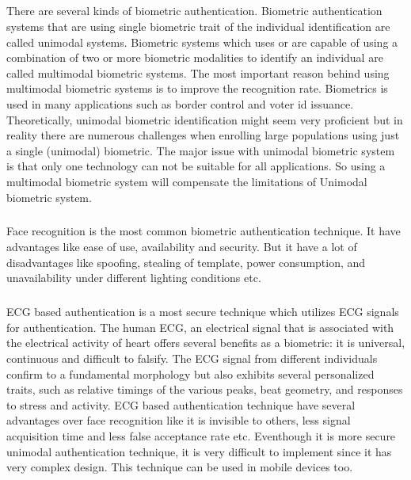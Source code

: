 \documentclass[10pt,a4paper,journal]{IEEEtran}
\begin{document}
\subparagraph{}
There are several kinds of biometric authentication. Biometric authentication systems that are using single biometric trait of the individual identification  are called unimodal systems. Biometric systems which uses or are capable of using a combination of two or more biometric modalities to identify an individual are called multimodal biometric systems. The most important reason behind using multimodal biometric systems is to improve the recognition rate.  Biometrics is used in many applications such as border control and voter id issuance. Theoretically, unimodal biometric identification might seem very proficient but in reality there are numerous challenges when enrolling large populations using just a single (unimodal) biometric. The major issue with unimodal biometric system is that only one technology can not be suitable for all applications. So using a multimodal biometric system will compensate the limitations of Unimodal biometric system. 

\subparagraph{}
Face recognition is the most common biometric authentication technique. It have advantages like ease of use, availability and security. But it have a lot of disadvantages like spoofing, stealing of  template, power consumption, and unavailability under different lighting conditions etc.

\subparagraph{}
ECG based authentication is a most secure technique which utilizes ECG signals for authentication. The human ECG, an electrical signal that is associated with the electrical activity of heart offers several benefits as a biometric: it is universal, continuous and difficult to falsify. The ECG signal from different individuals confirm to a fundamental morphology but also exhibits several personalized traits, such as relative timings of the various peaks, beat geometry, and responses to stress and activity. ECG based authentication technique have several advantages over face recognition like it is invisible to others, less signal acquisition time and less false acceptance rate etc. Eventhough it is more secure unimodal authentication technique, it is very difficult to implement since it has very complex design. This technique can be used in mobile devices too.
\end{document}
